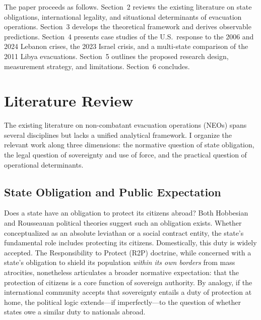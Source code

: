 \documentclass[12pt]{article}
\begin{document}
The paper proceeds as follows. Section~2 reviews the existing literature on state obligations, international legality, and situational determinants of evacuation operations. Section~3 develops the theoretical framework and derives observable predictions. Section~4 presents case studies of the U.S.\ response to the 2006 and 2024 Lebanon crises, the 2023 Israel crisis, and a multi-state comparison of the 2011 Libya evacuations. Section~5 outlines the proposed research design, measurement strategy, and limitations. Section~6 concludes.

\section{Literature Review}

The existing literature on non-combatant evacuation operations (NEOs) spans several disciplines but lacks a unified analytical framework. I organize the relevant work along three dimensions: the normative question of state obligation, the legal question of sovereignty and use of force, and the practical question of operational determinants.

\subsection{State Obligation and Public Expectation}

Does a state have an obligation to protect its citizens abroad? Both Hobbesian and Rousseauan political theories suggest such an obligation exists. Whether conceptualized as an absolute leviathan or a social contract entity, the state's fundamental role includes protecting its citizens. Domestically, this duty is widely accepted. The Responsibility to Protect (R2P) doctrine, while concerned with a state's obligation to shield its population \emph{within its own borders} from mass atrocities, nonetheless articulates a broader normative expectation: that the protection of citizens is a core function of sovereign authority. By analogy, if the international community accepts that sovereignty entails a duty of protection at home, the political logic extends---if imperfectly---to the question of whether states owe a similar duty to nationals abroad.
\end{document}
